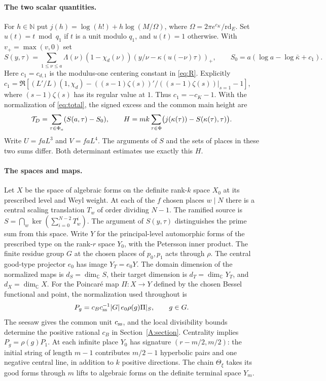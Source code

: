 \paragraph{The two scalar quantities.}
For $h\in\mathbb N$ put $j(h)=\log(h!)+h\log(M/\Omega)$,
where $\Omega=2\pi e^{c_K}/\mathrm{rd}_E$. Set $u(t)=t\bmod q_1$ if $t$ is a
unit modulo $q_1$, and $u(t)=1$ otherwise. With $v_+=\max(v,0)$ set
\[
 S(y,\tau)=\sum_{1\le\nu\le a}\Lambda(\nu)(1-\chi_d(\nu))
       (y/\nu-\kappa(u(-\nu)\tau))_+,
 \qquad S_0=a(\log a-\log\bar\kappa+c_1).
\]
Here $c_1=c_{d,1}$ is the modulus-one centering constant in \eqref{eq:R}. Explicitly
$c_1=\Re[(L'/L)(1,\chi_d)-((s-1)\zeta(s))'/((s-1)\zeta(s))|_{s=1}-1]$,
where $(s-1)\zeta(s)$ has its regular value at $1$. Thus $c_1=-c_K-1$.
With the normalization of \eqref{eq:total}, the signed excess
and the common main height are
\begin{equation}\label{sz:height}
 \mathcal T_D=\sum_{\tau\in\Phi_a}(S(a,\tau)-S_0),\qquad
 H=mk\sum_{\tau\in\Phi}\bigl(j(\kappa(\tau))-S(\kappa(\tau),\tau)\bigr).
\end{equation}
Write $U=faL^3$ and $V=faL^4$. The arguments of $S$ and the sets of places
in these two sums differ. Both determinant estimates use exactly this $H$.

\paragraph{The spaces and maps.}
Let $X$ be the space of algebraic forms on the definite rank-$k$ space
$X_0$ at its prescribed level and Weyl weight. At each of the $f$ chosen places
$w\mid N$ there is a central scaling translation $T_w$ of order dividing
$N-1$. The ramified source is $S=\bigcap_w\ker(\sum_{i=0}^{N-2}T_w^i)$.
The argument of $S(y,\tau)$ distinguishes the prime sum from this space.
Write $Y$ for the principal-level automorphic forms of the prescribed type
on the rank-$r$ space $Y_0$, with the Petersson inner product. The finite
residue group $G$ at the chosen places of $p_0,p_1$ acts through $\rho$.
The central good-type projector $e_0$ has image $Y_T=e_0Y$.
The domain dimension of the normalized maps is $d_S=\dim_\mathbb C S$,
their target dimension is $d_T=\dim_\mathbb C Y_T$, and $d_X=\dim_\mathbb C X$.
For the Poincar\'e map $\Pi:X\longrightarrow Y$ defined by the chosen Bessel
functional and point, the normalization used throughout is
\[
 P_g=c_B c_{\rm ss}^{-1}|G|\,e_0\rho(g)\Pi|_S,\qquad g\in G .
\]
The seesaw gives the common unit $c_{\rm ss}$, and the local divisibility
bounds determine the positive rational $c_B$ in Section~\ref{A:section}.
Centrality implies $P_g=\rho(g)P_1$. At each infinite place $Y_0$ has signature $(r-m/2,m/2)$: the initial
string of length $m-1$ contributes $m/2-1$ hyperbolic pairs and one
negative central line, in addition to $k$ positive directions. The chain $\Theta_\xi$ takes its good forms through $m$ lifts
to algebraic forms on the definite terminal space $Y_m$.

